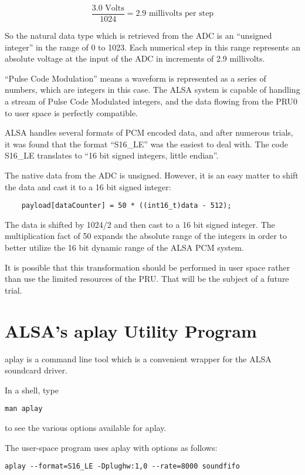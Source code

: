 \[ \frac{\text{3.0 Volts}}{1024}  = \text{2.9 millivolts per step} \]

So the natural data type which is retrieved from the ADC is an ``unsigned integer'' in the range of 0 to 1023.  Each numerical step in this range represents an absolute voltage at the input of the ADC in increments of 2.9 millivolts.

``Pulse Code Modulation'' means a waveform is represented as a series of numbers, which are integers in this case.  The ALSA system is capable of handling a stream of Pulse Code Modulated integers, and the data flowing from the PRU0 to user space is perfectly compatible.

ALSA handles several formats of PCM encoded data, and after numerous trials, it was found that the format ``S16\_LE'' was the easiest to deal with.  The code S16\_LE translates to ``16 bit signed integers, little endian''.

The native data from the ADC is unsigned.  However, it is an easy matter to shift the data and cast it to a 16 bit signed integer:

\begin{verbatim}
    payload[dataCounter] = 50 * ((int16_t)data - 512);
\end{verbatim}

The data is shifted by 1024/2 and then cast to a 16 bit signed integer.  The multiplication fact of 50 expands the absolute range of the integers in order to better utilize the 16 bit dynamic range of the ALSA PCM system.

It is possible that this transformation should be performed in user space rather than use the limited resources of the PRU.  That will be the subject of a future trial.

\section{ALSA's aplay Utility Program}

aplay is a command line tool which is a convenient wrapper for the ALSA soundcard driver.

In a shell, type

\begin{verbatim}
man aplay
\end{verbatim}

to see the various options available for aplay.

The user-space program uses aplay with options as follows:

\begin{verbatim}
aplay --format=S16_LE -Dplughw:1,0 --rate=8000 soundfifo
\end{verbatim}

